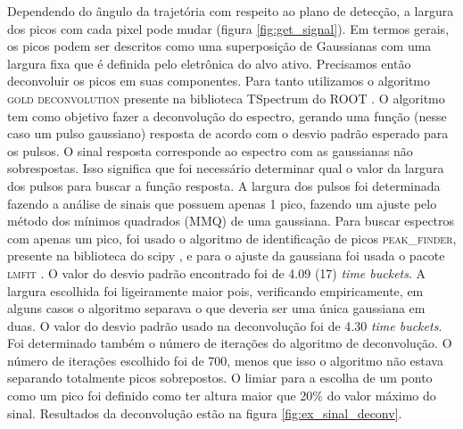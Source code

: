 \documentclass[a4paper,12pt,oneside]{book}
\begin{document}

\par Dependendo do ângulo da trajetória com respeito ao plano de detecção, a largura dos picos com cada pixel pode mudar (figura \ref{fig:get_signal}). Em termos gerais, os picos podem ser descritos como uma superposição de Gaussianas com uma largura fixa que é definida pelo eletrônica do alvo ativo. Precisamos então deconvoluir os picos em suas componentes. Para tanto utilizamos o algoritmo \textsc{gold deconvolution} presente na biblioteca TSpectrum do ROOT \cite{paper_gold_deconv}. O algoritmo tem como objetivo fazer a deconvolução do espectro, gerando uma função (nesse caso um pulso gaussiano) resposta de acordo com o desvio padrão esperado para os pulsos. O sinal resposta corresponde ao espectro com as gaussianas não sobrespostas. Isso significa que foi necessário determinar qual o valor da largura dos pulsos para buscar a função resposta. A largura dos pulsos foi determinada fazendo a análise de sinais que possuem apenas 1 pico, fazendo um ajuste pelo método dos mínimos quadrados (MMQ) de uma gaussiana. Para buscar espectros com apenas um pico, foi usado o algoritmo de identificação de picos \textsc{peak\_finder}, presente na biblioteca do scipy \cite{scipy}, e para o ajuste da gaussiana foi usada o pacote \textsc{lmfit} \cite{lmfit}. O valor do desvio padrão encontrado foi de 4.09 (17) \textit{time buckets}. A largura escolhida foi ligeiramente maior pois, verificando empiricamente, em alguns casos o algoritmo separava o que deveria ser uma única gaussiana em duas. O valor do desvio padrão usado na deconvolução foi de 4.30 \textit{time buckets}. Foi determinado também o número de iterações do algoritmo de deconvolução. O número de iterações escolhido foi de 700, menos que isso o algoritmo não estava separando totalmente picos sobrepostos. O limiar para a escolha de um ponto como um pico foi definido como ter altura maior que 20\% do valor máximo do sinal. Resultados da deconvolução estão na figura \ref{fig:ex_sinal_deconv}.
\end{document}
